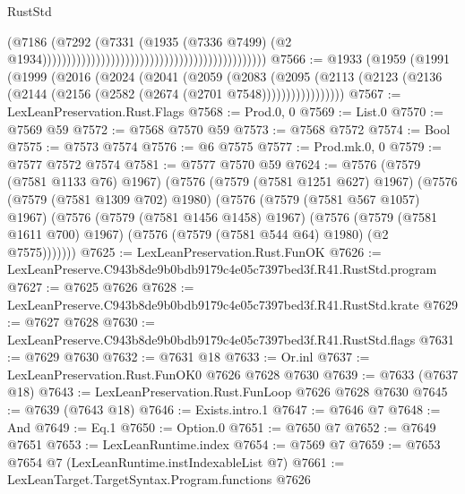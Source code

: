 \begin{lexlean}{RustStd}
\begin{coremodule}
                                                                                      (@7186
                                                                                        (@7292
                                                                                          (@7331
                                                                                            (@1935
                                                                                              (@7336
                                                                                                @7499)
                                                                                              (@2
                                                                                                @1934))))))))))))))))))))))))))))))))))))))))))))))
@7566 := @1933
    (@1959
      (@1991
        (@1999
          (@2016
            (@2024
              (@2041
                (@2059
                  (@2083
                    (@2095
                      (@2113 (@2123 (@2136 (@2144 (@2156 (@2582 (@2674 (@2701 @7548)))))))))))))))))
@7567 := LexLeanPreservation.Rust.Flags
@7568 := Prod.{0, 0}
@7569 := List.{0}
@7570 := @7569 @59
@7572 := @7568 @7570 @59
@7573 := @7568 @7572
@7574 := Bool
@7575 := @7573 @7574
@7576 := @6 @7575
@7577 := Prod.mk.{0, 0}
@7579 := @7577 @7572 @7574
@7581 := @7577 @7570 @59
@7624 := @7576
    (@7579 (@7581 @1133 @76) @1967)
    (@7576
      (@7579 (@7581 @1251 @627) @1967)
      (@7576
        (@7579 (@7581 @1309 @702) @1980)
        (@7576
          (@7579 (@7581 @567 @1057) @1967)
          (@7576
            (@7579 (@7581 @1456 @1458) @1967)
            (@7576
              (@7579 (@7581 @1611 @700) @1967)
              (@7576 (@7579 (@7581 @544 @64) @1980) (@2 @7575)))))))
@7625 := LexLeanPreservation.Rust.FunOK
@7626 := LexLeanPreserve.C943b8de9b0bdb9179c4e05c7397bed3f.R41.RustStd.program
@7627 := @7625 @7626
@7628 := LexLeanPreserve.C943b8de9b0bdb9179c4e05c7397bed3f.R41.RustStd.krate
@7629 := @7627 @7628
@7630 := LexLeanPreserve.C943b8de9b0bdb9179c4e05c7397bed3f.R41.RustStd.flags
@7631 := @7629 @7630
@7632 := @7631 @18
@7633 := Or.inl
@7637 := LexLeanPreservation.Rust.FunOK0 @7626 @7628 @7630
@7639 := @7633 (@7637 @18)
@7643 := LexLeanPreservation.Rust.FunLoop @7626 @7628 @7630
@7645 := @7639 (@7643 @18)
@7646 := Exists.intro.{1}
@7647 := @7646 @7
@7648 := And
@7649 := Eq.{1}
@7650 := Option.{0}
@7651 := @7650 @7
@7652 := @7649 @7651
@7653 := LexLeanRuntime.index
@7654 := @7569 @7
@7659 := @7653 @7654 @7 (LexLeanRuntime.instIndexableList @7)
@7661 := LexLeanTarget.TargetSyntax.Program.functions @7626

\end{coremodule}
\end{lexlean}
